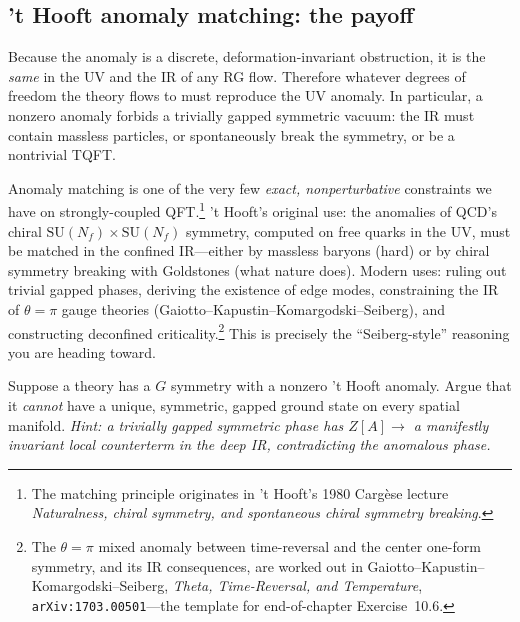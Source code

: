 \documentclass[11pt]{article}
\begin{document}
\subsection{'t Hooft anomaly matching: the payoff}

\begin{ttheorem}
Because the anomaly is a discrete, deformation-invariant obstruction, it is the
\emph{same} in the UV and the IR of any RG flow. Therefore whatever degrees of freedom
the theory flows to must reproduce the UV anomaly. In particular, a nonzero anomaly
forbids a trivially gapped symmetric vacuum: the IR must contain massless particles, or
spontaneously break the symmetry, or be a nontrivial TQFT.
\end{ttheorem}

\begin{iintuition}
Anomaly matching is one of the very few \emph{exact, nonperturbative} constraints we
have on strongly-coupled QFT.\footnote{The matching principle originates in 't Hooft's
1980 Carg\`ese lecture \emph{Naturalness, chiral symmetry, and spontaneous chiral
symmetry breaking}.} 't Hooft's original use: the anomalies of QCD's chiral
$\mathrm{SU}(N_f)\times\mathrm{SU}(N_f)$ symmetry, computed on free quarks in the UV,
must be matched in the confined IR---either by massless baryons (hard) or by chiral
symmetry breaking with Goldstones (what nature does). Modern uses: ruling out trivial
gapped phases, deriving the existence of edge modes, constraining the IR of
$\theta=\pi$ gauge theories (Gaiotto--Kapustin--Komargodski--Seiberg), and constructing
deconfined criticality.\footnote{The $\theta=\pi$ mixed anomaly between time-reversal and
the center one-form symmetry, and its IR consequences, are worked out in
Gaiotto--Kapustin--Komargodski--Seiberg, \emph{Theta, Time-Reversal, and Temperature},
\texttt{arXiv:1703.00501}---the template for end-of-chapter Exercise~10.6.} This is
precisely the ``Seiberg-style'' reasoning you are heading toward.
\end{iintuition}

\begin{xca}
Suppose a theory has a $G$ symmetry with a nonzero 't Hooft anomaly. Argue that it
\emph{cannot} have a unique, symmetric, gapped ground state on every spatial manifold.
\emph{Hint: a trivially gapped symmetric phase has $Z[A]\to$ a manifestly invariant
local counterterm in the deep IR, contradicting the anomalous phase.}
\end{xca}
\end{document}
